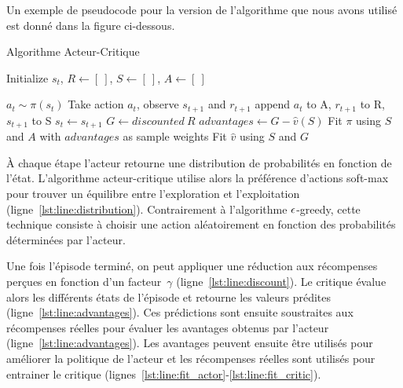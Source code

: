 Un exemple de pseudocode pour la version de l'algorithme que nous avons utilisé est donné dans la figure ci-dessous.
\begin{algorithm}
\caption{Algorithme Acteur-Critique}\label{alg:a2c}
\begin{algorithmic}[1]

\State Initialize $s_t$, $R \gets [~]$, $S \gets [~]$, $A \gets [~]$

\State $a_t \sim \pi(s_t)$  \label{lst:line:distribution}
  \State Take action $a_t$, observe $s_{t+1}$ and $r_{t+1}$
\State append $a_t$ to A, $r_{t+1}$ to R, $s_{t+1}$ to S
  \State $s_t \gets s_{t+1}$
\EndFor
\State $G \gets discounted~R$ \label{lst:line:discount}
\State $advantages \gets G - \hat{v}(S)$  \label{lst:line:advantages}
\State Fit $\pi$ using \(S\) and \(A\) with $advantages$ as sample weights \label{lst:line:fit_actor}
\State Fit $\hat{v}$ using \(S\) and \(G\) \label{lst:line:fit_critic}
\EndFor
\end{algorithmic}
\end{algorithm}

À chaque étape l'acteur retourne une distribution de probabilités en fonction de l'état.
L'algorithme acteur-critique utilise alors la préférence d'actions soft-max pour trouver un équilibre entre l'exploration et l'exploitation (ligne~\ref{lst:line:distribution}). 
Contrairement à l'algorithme $\large\epsilon$-greedy, cette technique consiste à choisir une action aléatoirement en fonction des probabilités déterminées par l'acteur. \cite{BartoSutton}

Une fois l'épisode terminé, on peut appliquer une réduction aux récompenses perçues en fonction d'un facteur~$\gamma$ (ligne~\ref{lst:line:discount}).
Le critique évalue alors les différents états de l'épisode et retourne les valeurs prédites (ligne~\ref{lst:line:advantages}).
Ces prédictions sont ensuite soustraites aux récompenses réelles pour évaluer les avantages obtenus par l'acteur (ligne~\ref{lst:line:advantages}).
Les avantages peuvent ensuite être utilisés pour améliorer la politique de l'acteur et les récompenses réelles sont utilisés pour 
entrainer le critique (lignes~\ref{lst:line:fit_actor}-\ref{lst:line:fit_critic}).
